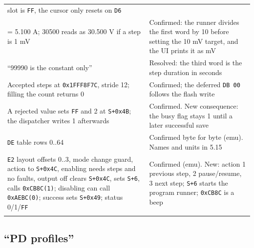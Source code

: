 {\begin{longtable}[]{@{}
  >{\raggedright\arraybackslash}p{}
  >{\raggedright\arraybackslash}p{}@{}}
slot is \texttt{FF}, the cursor only resets on \texttt{D6} \\
5100 = 5.100 A; 30500 reads as 30.500 V if a step is 1 mV & Confirmed:
the runner divides the first word by 10 before setting the 10 mV target,
and the UI prints it as mV \\
``99990 is the constant only'' & Resolved: the third word is the step
duration in seconds \\
Accepted steps at \texttt{0x1FFF8F7C}, stride 12; filling the count
returns 0 & Confirmed; the deferred \texttt{DB\ 00} follows the flash
write \\
A rejected value sets \texttt{FF} and 2 at \texttt{S+0x4B}; the
dispatcher writes 1 afterwards & Confirmed. New consequence: the busy
flag stays 1 until a later successful save \\
\texttt{DE} table rows 0..64 & Confirmed byte for byte (emu). Names and
units in 5.15 \\
\texttt{E2} layout offsets 0..3, mode change guard, action to
\texttt{S+0x4C}, enabling needs steps and no faults, output off clears
\texttt{S+0x4C}, sets \texttt{S+6}, calls \texttt{0xCB8C(1)}; disabling
can call \texttt{0xAEBC(0)}; success sets \texttt{S+0x49}; status
0/1/\texttt{FF} & Confirmed (emu). New: action 1 previous step, 2
pause/resume, 3 next step; \texttt{S+6} starts the program runner;
\texttt{0xCB8C} is a beep \\*
\end{longtable}
}

\subsection{``PD profiles''}\label{pd-profiles}

